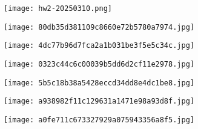 \begin{figure}[H]
\centering
\texttt{[image: hw2-20250310.png]}
\label{}
\end{figure}

\begin{figure}[H]
\centering
\texttt{[image: 80db35d381109c8660e72b5780a7974.jpg]}
\label{}
\end{figure}

\begin{figure}[H]
\centering
\texttt{[image: 4dc77b96d7fca2a1b031be3f5e5c34c.jpg]}
\label{}
\end{figure}

\begin{figure}[H]
\centering
\texttt{[image: 0323c44c6c00039b5dd6d2cf11e2978.jpg]}
\label{}
\end{figure}

\begin{figure}[H]
\centering
\texttt{[image: 5b5c18b38a5428eccd34dd8e4dc1be8.jpg]}
\label{}
\end{figure}

\begin{figure}[H]
\centering
\texttt{[image: a938982f11c129631a1471e98a93d8f.jpg]}
\label{}
\end{figure}

\begin{figure}[H]
\centering
\texttt{[image: a0fe711c673327929a075943356a8f5.jpg]}
\label{}
\end{figure}
